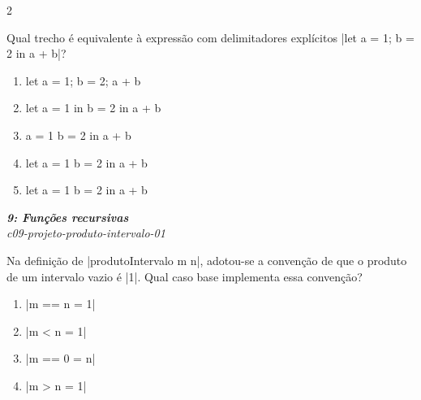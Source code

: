 \documentclass[a4paper,10pt,brazil]{article}
\begin{document}
\begin{multicols}{2}
\begin{flushright}
\end{flushright}
Qual trecho é equivalente à expressão com delimitadores explícitos \haskellinline|let { a = 1; b = 2 } in a + b|?

\begin{enumerate}
  \item \begin{haskellcode}
let a = 1; b = 2; a + b
\end{haskellcode}

  \item \begin{haskellcode}
let a = 1
in b = 2
in a + b
\end{haskellcode}

  \item \begin{haskellcode}
a = 1
b = 2
in a + b
\end{haskellcode}

  \item \begin{haskellcode}
let a = 1
  b = 2
in a + b
\end{haskellcode}

  \item \begin{haskellcode}
let a = 1
    b = 2
in a + b
\end{haskellcode}


\end{enumerate}

\begin{flushright}
  \footnotesize
  \textit{\textbf{9: Funções recursivas}}\\
  \textit{c09-projeto-produto-intervalo-01}\\

\end{flushright}
Na definição de \haskellinline|produtoIntervalo m n|, adotou-se a convenção de que o produto de um intervalo vazio é \haskellinline|1|. Qual caso base implementa essa convenção?

\begin{enumerate}
  \item \haskellinline|m == n = 1|

  \item \haskellinline|m < n = 1|

  \item \haskellinline|m == 0 = n|

  \item \haskellinline|m > n = 1|


\end{enumerate}
\end{multicols}
\end{document}
